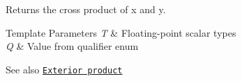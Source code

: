 Returns the cross product of x and y.


\begin{DoxyTemplParams}{Template Parameters}
{\em T} & Floating-\/point scalar types \\
\hline
{\em Q} & Value from qualifier enum\\
\hline
\end{DoxyTemplParams}
\begin{DoxySeeAlso}{See also}
\href{https://en.wikipedia.org/wiki/Exterior_algebra#Cross_and_triple_products}{\tt Exterior product} 
\end{DoxySeeAlso}
